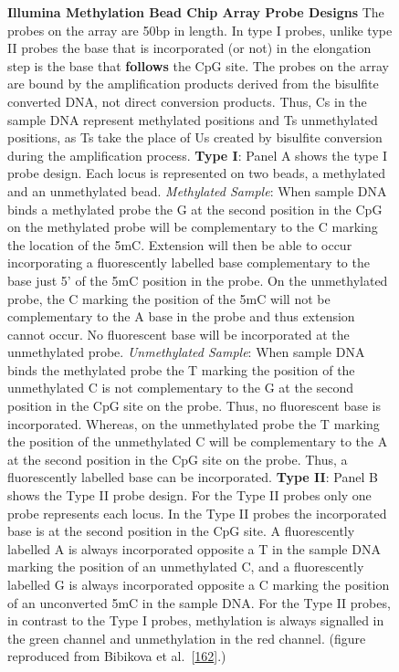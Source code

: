 \documentclass[
]{book}
\begin{document}
\begin{figure}
\caption{\textbf{Illumina Methylation Bead Chip Array Probe Designs} The probes on the array are 50bp in length. In type I probes, unlike type II probes the base that is incorporated (or not) in the elongation step is the base that \textbf{follows} the CpG site. The probes on the array are bound by the amplification products derived from the bisulfite converted DNA, not direct conversion products. Thus, Cs in the sample DNA represent methylated positions and Ts unmethylated positions, as Ts take the place of Us created by bisulfite conversion during the amplification process. \textbf{Type I}: Panel A shows the type I probe design. Each locus is represented on two beads, a methylated and an unmethylated bead. \emph{Methylated Sample}: When sample DNA binds a methylated probe the G at the second position in the CpG on the methylated probe will be complementary to the C marking the location of the 5mC. Extension will then be able to occur incorporating a fluorescently labelled base complementary to the base just 5' of the 5mC position in the probe. On the unmethylated probe, the C marking the position of the 5mC will not be complementary to the A base in the probe and thus extension cannot occur. No fluorescent base will be incorporated at the unmethylated probe. \emph{Unmethylated Sample}: When sample DNA binds the methylated probe the T marking the position of the unmethylated C is not complementary to the G at the second position in the CpG site on the probe. Thus, no fluorescent base is incorporated. Whereas, on the unmethylated probe the T marking the position of the unmethylated C will be complementary to the A at the second position in the CpG site on the probe. Thus, a fluorescently labelled base can be incorporated. \textbf{Type II}: Panel B shows the Type II probe design. For the Type II probes only one probe represents each locus. In the Type II probes the incorporated base is at the second position in the CpG site. A fluorescently labelled A is always incorporated opposite a T in the sample DNA marking the position of an unmethylated C, and a fluorescently labelled G is always incorporated opposite a C marking the position of an unconverted 5mC in the sample DNA. For the Type II probes, in contrast to the Type I probes, methylation is always signalled in the green channel and unmethylation in the red channel. (figure reproduced from Bibikova et al.~{[}\protect\hyperlink{ref-Bibikova2011}{162}{]}.)}\label{fig:Bibikova2011IlluminaMethylationBeadChip}
\end{figure}
\end{document}

